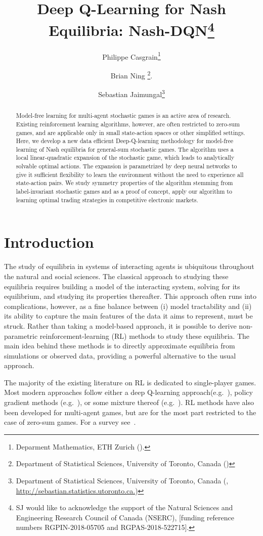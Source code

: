 \documentclass[onefignum,onetabnum]{siamonline171218}
\title{Deep Q-Learning for Nash Equilibria: Nash-DQN\thanks{SJ would like to acknowledge the support of the Natural Sciences and Engineering Research Council of Canada
(NSERC), [funding reference numbers RGPIN-2018-05705 and RGPAS-2018-522715].}}
\author{
Philippe Casgrain\thanks{Deparment Mathematics, ETH Zurich (\email{Philippe Casgrain <philippe.casgrain@math.ethz.ch>}).}
\and
Brian Ning \thanks{Department of Statistical Sciences, University of Toronto, Canada (\email{brian.ning@mail.utoronto.ca})}.
\and
Sebastian Jaimungal\thanks{Department of Statistical Sciences, University of Toronto, Canada (\email{sebastian.jaimungal@utoronto.ca}, \url{http://sebastian.statistics.utoronto.ca.})}
}
\begin{document}
\maketitle

\begin{abstract}
Model-free learning for multi-agent stochastic games is an active area of research. Existing reinforcement learning algorithms, however,  are often restricted to zero-sum games, and are applicable only in small state-action spaces or other simplified settings. 
Here, we develop a new data efficient Deep-Q-learning methodology for model-free learning of Nash equilibria for general-sum stochastic games. The algorithm uses a local linear-quadratic expansion of the stochastic game, which leads to analytically solvable optimal actions. The expansion is parametrized by deep neural networks to give it sufficient flexibility to learn the environment without the need to experience all state-action pairs. We study symmetry properties of the algorithm stemming from label-invariant stochastic games and as a proof of concept, apply our algorithm to learning optimal trading strategies in competitive electronic markets.
\end{abstract}

\section{Introduction}

The study of equilibria in systems of interacting agents is ubiquitous throughout the natural and social sciences. The classical approach to studying these equilibria requires building a model of the interacting system, solving for its equilibrium, and studying its properties thereafter. This approach often runs into complications, however, as a fine balance  between (i) model tractability and (ii) its ability to capture the main features of the data it aims to represent, must be struck. Rather than taking a model-based approach, it is possible to derive non-parametric reinforcement-learning (RL) methods to study these equilibria. The main idea behind  these methods is to directly approximate equilibria from simulations or observed data, providing a powerful alternative to the usual approach.

The majority of the existing literature on RL is dedicated to single-player games. Most modern approaches follow either a deep Q-learning approach(e.g.~\cite{mnih2013playing}), policy gradient methods (e.g.~\cite{sutton2000policy}), or some mixture thereof (e.g.~\cite{hessel2018rainbow}). RL  methods have also been developed for multi-agent games, but are for the most part restricted to the case of zero-sum games. For a survey see~\cite{bu2008comprehensive}. 
\end{document}
